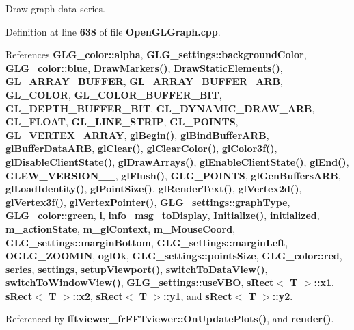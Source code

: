 Draw graph data series. 



Definition at line {\bf 638} of file {\bf Open\+G\+L\+Graph.\+cpp}.



References {\bf G\+L\+G\+\_\+color\+::alpha}, {\bf G\+L\+G\+\_\+settings\+::background\+Color}, {\bf G\+L\+G\+\_\+color\+::blue}, {\bf Draw\+Markers()}, {\bf Draw\+Static\+Elements()}, {\bf G\+L\+\_\+\+A\+R\+R\+A\+Y\+\_\+\+B\+U\+F\+F\+ER}, {\bf G\+L\+\_\+\+A\+R\+R\+A\+Y\+\_\+\+B\+U\+F\+F\+E\+R\+\_\+\+A\+RB}, {\bf G\+L\+\_\+\+C\+O\+L\+OR}, {\bf G\+L\+\_\+\+C\+O\+L\+O\+R\+\_\+\+B\+U\+F\+F\+E\+R\+\_\+\+B\+IT}, {\bf G\+L\+\_\+\+D\+E\+P\+T\+H\+\_\+\+B\+U\+F\+F\+E\+R\+\_\+\+B\+IT}, {\bf G\+L\+\_\+\+D\+Y\+N\+A\+M\+I\+C\+\_\+\+D\+R\+A\+W\+\_\+\+A\+RB}, {\bf G\+L\+\_\+\+F\+L\+O\+AT}, {\bf G\+L\+\_\+\+L\+I\+N\+E\+\_\+\+S\+T\+R\+IP}, {\bf G\+L\+\_\+\+P\+O\+I\+N\+TS}, {\bf G\+L\+\_\+\+V\+E\+R\+T\+E\+X\+\_\+\+A\+R\+R\+AY}, {\bf gl\+Begin()}, {\bf gl\+Bind\+Buffer\+A\+RB}, {\bf gl\+Buffer\+Data\+A\+RB}, {\bf gl\+Clear()}, {\bf gl\+Clear\+Color()}, {\bf gl\+Color3f()}, {\bf gl\+Disable\+Client\+State()}, {\bf gl\+Draw\+Arrays()}, {\bf gl\+Enable\+Client\+State()}, {\bf gl\+End()}, {\bf G\+L\+E\+W\+\_\+\+V\+E\+R\+S\+I\+O\+N\+\_\+\_}, {\bf gl\+Flush()}, {\bf G\+L\+G\+\_\+\+P\+O\+I\+N\+TS}, {\bf gl\+Gen\+Buffers\+A\+RB}, {\bf gl\+Load\+Identity()}, {\bf gl\+Point\+Size()}, {\bf gl\+Render\+Text()}, {\bf gl\+Vertex2d()}, {\bf gl\+Vertex3f()}, {\bf gl\+Vertex\+Pointer()}, {\bf G\+L\+G\+\_\+settings\+::graph\+Type}, {\bf G\+L\+G\+\_\+color\+::green}, {\bf i}, {\bf info\+\_\+msg\+\_\+to\+Display}, {\bf Initialize()}, {\bf initialized}, {\bf m\+\_\+action\+State}, {\bf m\+\_\+gl\+Context}, {\bf m\+\_\+\+Mouse\+Coord}, {\bf G\+L\+G\+\_\+settings\+::margin\+Bottom}, {\bf G\+L\+G\+\_\+settings\+::margin\+Left}, {\bf O\+G\+L\+G\+\_\+\+Z\+O\+O\+M\+IN}, {\bf ogl\+Ok}, {\bf G\+L\+G\+\_\+settings\+::points\+Size}, {\bf G\+L\+G\+\_\+color\+::red}, {\bf series}, {\bf settings}, {\bf setup\+Viewport()}, {\bf switch\+To\+Data\+View()}, {\bf switch\+To\+Window\+View()}, {\bf G\+L\+G\+\_\+settings\+::use\+V\+BO}, {\bf s\+Rect$<$ T $>$\+::x1}, {\bf s\+Rect$<$ T $>$\+::x2}, {\bf s\+Rect$<$ T $>$\+::y1}, and {\bf s\+Rect$<$ T $>$\+::y2}.



Referenced by {\bf fftviewer\+\_\+fr\+F\+F\+Tviewer\+::\+On\+Update\+Plots()}, and {\bf render()}.



